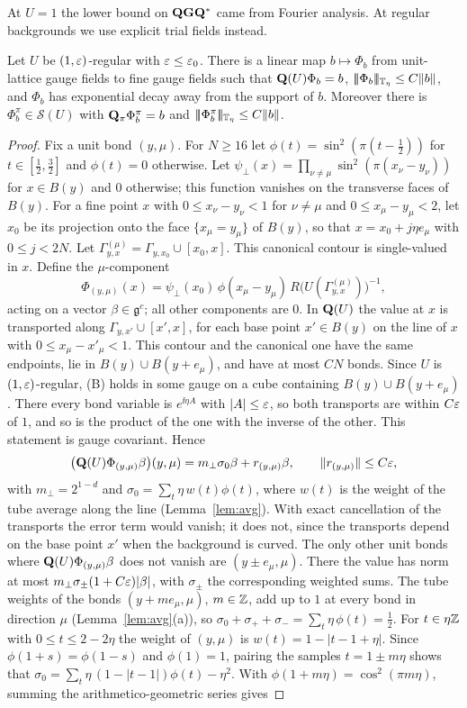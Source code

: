 At $U=1$ the lower bound on $\mathbf Q\mathbf G\mathbf Q^*$ came from Fourier analysis. At regular backgrounds we use explicit trial fields instead.

\begin{lemma}\label{lem:trial-gauge}
Let $U$ be $(1,\varepsilon)$-regular with $\varepsilon\le\varepsilon_0$. There is a linear map $b\mapsto\Phi_b$ from unit-lattice gauge fields to fine gauge fields such that $\mathbf Q(U)\Phi_b=b$, $|\!|\!|\Phi_b|\!|\!|_{\mathbb T_\eta}\le C\|b\|$, and $\Phi_b$ has exponential decay away from the support of $b$. Moreover there is $\Phi^\pi_b\in\mathcal S(U)$ with $\mathbf Q_\pi\Phi^\pi_b=b$ and $|\!|\!|\Phi^\pi_b|\!|\!|_{\mathbb T_\eta}\le C\|b\|$.
\end{lemma}

\begin{proof}
Fix a unit bond $(y,\mu)$. For $N\ge16$ let $\phi(t)=\sin^2(\pi(t-\frac12))$ for $t\in[\frac12,\frac32]$ and $\phi(t)=0$ otherwise. Let $\psi_\perp(x)=\prod_{\nu\ne\mu}\sin^2(\pi(x_\nu-y_\nu))$ for $x\in B(y)$ and $0$ otherwise; this function vanishes on the transverse faces of $B(y)$. For a fine point $x$ with $0\le x_\nu-y_\nu<1$ for $\nu\ne\mu$ and $0\le x_\mu-y_\mu<2$, let $x_0$ be its projection onto the face $\{x_\mu=y_\mu\}$ of $B(y)$, so that $x=x_0+j\eta e_\mu$ with $0\le j<2N$. Let $\Gamma^{(\mu)}_{y,x}=\Gamma_{y,x_0}\cup[x_0,x]$. This canonical contour is single-valued in $x$. Define the $\mu$-component
\[
\Phi_{(y,\mu)}(x)=\psi_\perp(x_0)\,\phi(x_\mu-y_\mu)\,R\big(U(\Gamma^{(\mu)}_{y,x})\big)^{-1},
\]
acting on a vector $\beta\in\mathfrak g^c$; all other components are $0$. In $\mathbf Q(U)$ the value at $x$ is transported along $\Gamma_{y,x'}\cup[x',x]$, for each base point $x'\in B(y)$ on the line of $x$ with $0\le x_\mu-x'_\mu<1$. This contour and the canonical one have the same endpoints, lie in $B(y)\cup B(y+e_\mu)$, and have at most $CN$ bonds. Since $U$ is $(1,\varepsilon)$-regular, (B) holds in some gauge on a cube containing $B(y)\cup B(y+e_\mu)$. There every bond variable is $e^{\ii\eta A}$ with $|A|\le\varepsilon$, so both transports are within $C\varepsilon$ of $1$, and so is the product of the one with the inverse of the other. This statement is gauge covariant. Hence
\[
\big(\mathbf Q(U)\Phi_{(y,\mu)}\beta\big)(y,\mu)=m_\perp\sigma_0\beta+r_{(y,\mu)}\beta,\qquad\|r_{(y,\mu)}\|\le C\varepsilon,
\]
with $m_\perp=2^{1-d}$ and $\sigma_0=\sum_t\eta\,w(t)\phi(t)$, where $w(t)$ is the weight of the tube average along the line (Lemma~\ref{lem:avg}). With exact cancellation of the transports the error term would vanish; it does not, since the transports depend on the base point $x'$ when the background is curved. The only other unit bonds where $\mathbf Q(U)\Phi_{(y,\mu)}\beta$ does not vanish are $(y\pm e_\mu,\mu)$. There the value has norm at most $m_\perp\sigma_\pm(1+C\varepsilon)|\beta|$, with $\sigma_\pm$ the corresponding weighted sums. The tube weights of the bonds $(y+me_\mu,\mu)$, $m\in\mathbb Z$, add up to $1$ at every bond in direction $\mu$ (Lemma~\ref{lem:avg}(a)), so $\sigma_0+\sigma_++\sigma_-=\sum_t\eta\,\phi(t)=\frac12$. For $t\in\eta\mathbb Z$ with $0\le t\le2-2\eta$ the weight of $(y,\mu)$ is $w(t)=1-|t-1+\eta|$. Since $\phi(1+s)=\phi(1-s)$ and $\phi(1)=1$, pairing the samples $t=1\pm m\eta$ shows that $\sigma_0=\sum_t\eta\,(1-|t-1|)\phi(t)-\eta^2$. With $\phi(1+m\eta)=\cos^2(\pi m\eta)$, summing the arithmetico-geometric series gives

\end{proof}
